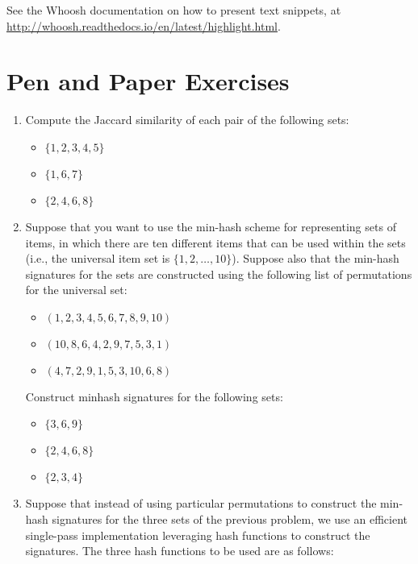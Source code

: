 \documentclass[12pt]{article}
\begin{document}
See the Whoosh documentation on how to present text snippets, at
\url{http://whoosh.readthedocs.io/en/latest/highlight.html}.

\section{Pen and Paper Exercises}

\begin{enumerate}
\item Compute the Jaccard similarity of each pair of the following sets: 

\begin{itemize}
\item $\{1, 2, 3, 4, 5\}$
\item $\{1, 6, 7\}$
\item $\{2, 4, 6, 8\}$
\end{itemize}


\item Suppose that you want to use the min-hash scheme for representing sets of items, in which there are ten different items that can be used within the sets (i.e., the universal item set is $\{ 1, 2, \ldots , 10\}$). Suppose also that the min-hash signatures for the sets are constructed using the following list of permutations for the universal set:

\begin{itemize}
\item $(1,2,3,4,5,6,7,8,9,10)$ 
\item $(10,8,6,4,2,9,7,5,3,1)$ 
\item $(4,7,2,9,1,5,3,10,6,8)$
\end{itemize}

Construct minhash signatures for the following sets: 

\begin{itemize}
\item $\{3,6,9\}$
\item $\{2,4,6,8\}$
\item $\{2,3,4\}$
\end{itemize}


\item Suppose that instead of using particular permutations to construct the min-hash signatures for the three sets of the previous problem, we use an efficient single-pass implementation leveraging hash functions to construct the signatures. The three hash functions to be used are as follows:


\end{enumerate}
\end{document}
